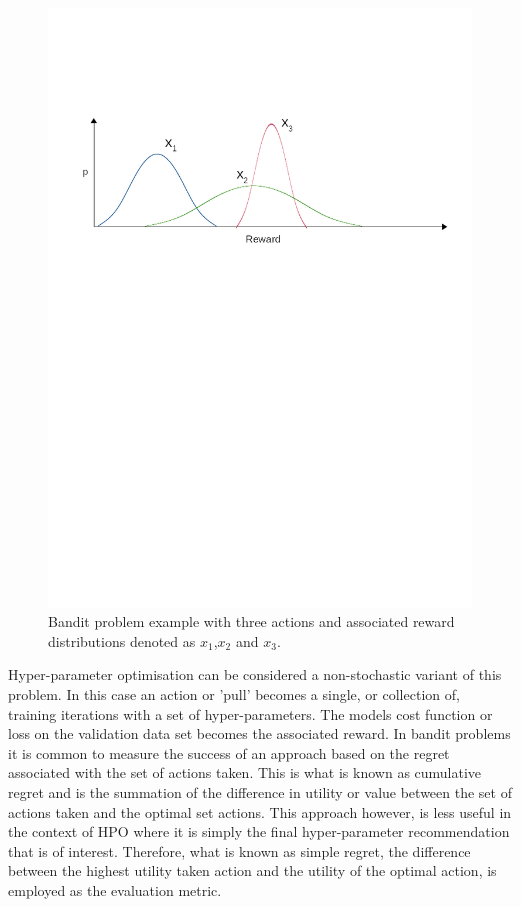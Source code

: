 \documentclass{article}
\begin{document}
	\begin{figure}[h]\label{fig:BPI}
	
		\centering 
		\includegraphics[trim= 100 650 100 100 ,scale=0.5]{BanditIntro.png}


		\caption{Bandit problem example with three actions and associated reward distributions denoted as \(x_1\),\(x_2\) and \(x_3\). }



	\end{figure}


	\par

	Hyper-parameter optimisation can be considered a non-stochastic variant of this problem. In this case an action or 'pull' becomes a single, or collection of, training iterations with a set of hyper-parameters. The models cost function or loss on the validation data set becomes the associated reward. In bandit problems it is common to measure the success of an approach based on the regret associated with the set of actions taken. This is what is known as cumulative regret and is the summation of the difference in utility or value between the set of actions taken and the optimal set actions. This approach however, is less useful in the context of HPO where it is simply the final hyper-parameter recommendation that is of interest. Therefore, what is known as simple regret, the difference between the highest utility taken action and the utility of the optimal action, is employed as the evaluation metric.
\end{document}
